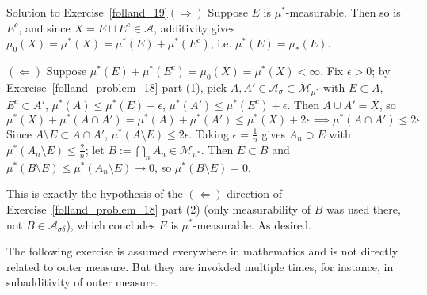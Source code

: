 \begin{mystsolution}{Solution to Exercise~\ref{folland_19}}$(\Longrightarrow)$ Suppose $E$ is $\mu^*$-measurable. Then so is $E^c$, and since $X=E\sqcup E^c \in \mathcal A$, additivity gives $\mu_0(X)=\mu^*(X)=\mu^*(E)+\mu^*(E^c)$, i.e. $\mu^*(E)=\mu_*(E)$.

$(\Longleftarrow)$ Suppose $\mu^*(E)+\mu^*(E^c)=\mu_0(X)=\mu^*(X)<\infty$. Fix $\epsilon>0$; by Exercise~\ref{folland_problem_18} part (1), pick $A,A'\in \mathcal A_\sigma\subset \mathcal M_{\mu^*}$ with $E\subset A$, $E^c\subset A'$, $\mu^*(A)\leq \mu^*(E)+\epsilon$, $\mu^*(A')\leq \mu^*(E^c)+\epsilon$. Then $A\cup A'=X$, so
\begin{equation}
\mu^*(X)+\mu^*(A\cap A') = \mu^*(A)+\mu^*(A') \leq \mu^*(X)+2\epsilon \implies \mu^*(A\cap A')\leq 2\epsilon
\end{equation}
Since $A\setminus E \subset A\cap A'$, $\mu^*(A\setminus E)\leq 2\epsilon$. Taking $\epsilon=\frac1n$ gives $A_n\supset E$ with $\mu^*(A_n\setminus E)\leq \frac2n$; let $B:=\bigcap_n A_n\in \mathcal M_{\mu^*}$. Then $E\subset B$ and $\mu^*(B\setminus E)\leq \mu^*(A_n\setminus E)\to 0$, so $\mu^*(B\setminus E)=0$.

This is exactly the hypothesis of the $(\Longleftarrow)$ direction of Exercise~\ref{folland_problem_18} part (2) (only measurability of $B$ was used there, not $B\in\mathcal A_{\sigma\delta}$), which concludes $E$ is $\mu^*$-measurable. As desired.

\end{mystsolution}
The following exercise is assumed everywhere in mathematics and is not directly related to outer measure. But they are invokded multiple times, for instance, in subadditivity of outer measure.

